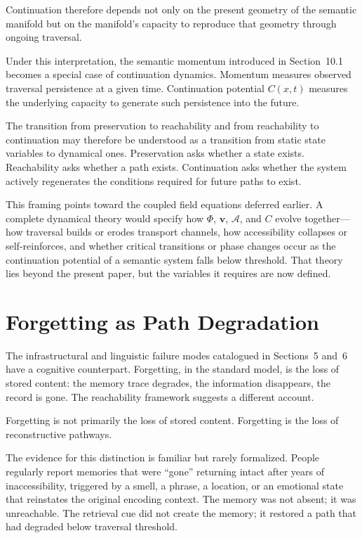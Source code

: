 \documentclass[12pt]{article}
\begin{document}
Continuation therefore depends not only on the present geometry of the
semantic manifold but on the manifold's capacity to reproduce that
geometry through ongoing traversal.

Under this interpretation, the semantic momentum introduced in
Section~10.1 becomes a special case of continuation dynamics.
Momentum measures observed traversal persistence at a given time.
Continuation potential $C(x,t)$ measures the underlying capacity to
generate such persistence into the future.

The transition from preservation to reachability and from reachability
to continuation may therefore be understood as a transition from static
state variables to dynamical ones.
Preservation asks whether a state exists.
Reachability asks whether a path exists.
Continuation asks whether the system actively regenerates the conditions
required for future paths to exist.

This framing points toward the coupled field equations deferred earlier.
A complete dynamical theory would specify how $\Phi$, $\mathbf{v}$,
$\mathcal{A}$, and $C$ evolve together---how traversal builds or erodes
transport channels, how accessibility collapses or self-reinforces, and
whether critical transitions or phase changes occur as the continuation
potential of a semantic system falls below threshold.
That theory lies beyond the present paper, but the variables it requires
are now defined.

\section{Forgetting as Path Degradation}

The infrastructural and linguistic failure modes catalogued in Sections~5
and~6 have a cognitive counterpart.
Forgetting, in the standard model, is the loss of stored content: the
memory trace degrades, the information disappears, the record is gone.
The reachability framework suggests a different account.

Forgetting is not primarily the loss of stored content.
Forgetting is the loss of reconstructive pathways.

The evidence for this distinction is familiar but rarely formalized.
People regularly report memories that were ``gone'' returning intact
after years of inaccessibility, triggered by a smell, a phrase, a
location, or an emotional state that reinstates the original encoding
context.
The memory was not absent; it was unreachable.
The retrieval cue did not create the memory; it restored a path that
had degraded below traversal threshold.
\end{document}
